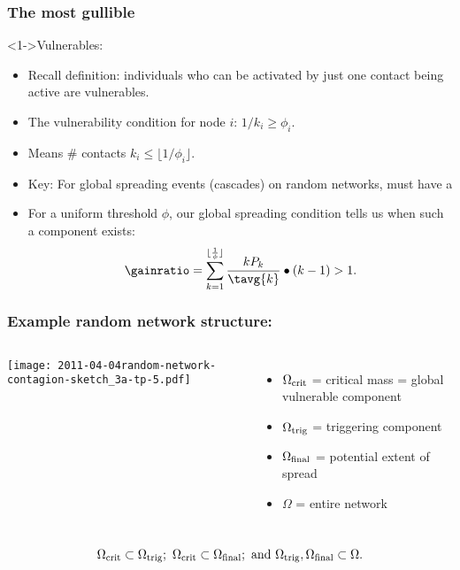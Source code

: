 \begin{frame}
  \frametitle{The most gullible}

  \begin{block}<1->{Vulnerables:}
    \begin{itemize}
    \item<2-> Recall definition: individuals who can be activated by
    just one contact being active are \alert{vulnerables}.
    \item<3-> The vulnerability condition for node $i$:
      $1/k_i \ge \phi_i$.
    \item<4->
      Means \# contacts  $k_{i} \le \lfloor 1/\phi_i \rfloor$.
    \item<5->
      \alert{Key:} For global spreading events (cascades) on random networks, must have a
      \cite{watts2002a}
    \item<6-> For a uniform threshold $\phi$, our global spreading condition
      tells us when such a component exists:
      $$
      \gainratio
      =
      \sum_{k=1}^{{\lfloor \frac{1}{\phi} \rfloor}}
      \frac{kP_k}{\tavg{k}} 
      \bullet
      (k-1)
      > 1.
      $$
    \end{itemize}
  \end{block}

\end{frame}

\begin{frame}
  \frametitle{Example random network structure:}

  \begin{columns}
    \texttt{[image: 2011-04-04random-network-contagion-sketch\_3a-tp-5.pdf]}
    \begin{itemize}
    \item 
      $\Omega_{\textnormal{crit}}$ = critical mass = global vulnerable component
    \item 
      $\Omega_{\textnormal{trig}}$ = triggering component
    \item 
      $\Omega_{\textnormal{final}}$ = potential extent of spread
    \item 
      $\Omega$ = entire network
    \end{itemize}
  \end{columns}
  \bigskip
  $$
  \Omega_{\textnormal{crit}} 
  \subset
  \Omega_{\textnormal{trig}};
  \
  \Omega_{\textnormal{crit}} 
  \subset
  \Omega_{\textnormal{final}};
  \
  \mbox{and}
  \
  \Omega_{\textnormal{trig}},
  \Omega_{\textnormal{final}} 
  \subset
  \Omega.
  $$
\end{frame}


